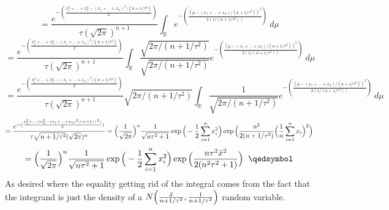 \documentclass{article}
\begin{document}
\begin{center}
    \[=\frac{e^{-(\frac{x_1^2 + ... + x_n^2 - (x_1 + ... + x_n)^2/(n + 1/\tau^2)}{2})}}{\tau(\sqrt{2\pi})^{n+1}}\int_{\mathbb{R}} e^{-(\frac{(\mu - (x_1 + ... + x_n)/(n + 1/\tau^2))^2}{2(1/(n + 1/\tau^2))})} \:d\mu\]
    \[=\frac{e^{-(\frac{x_1^2 + ... + x_n^2 - (x_1 + ... + x_n)^2/(n + 1/\tau^2)}{2})}}{\tau(\sqrt{2\pi})^{n+1}}\int_{\mathbb{R}} \frac{\sqrt{2\pi/(n+1/\tau^2)}}{\sqrt{2\pi/(n+1/\tau^2)}}e^{-(\frac{(\mu - (x_1 + ... + x_n)/(n + 1/\tau^2))^2}{2(1/(n + 1/\tau^2))})} \:d\mu\]
    \[=\frac{e^{-(\frac{x_1^2 + ... + x_n^2 - (x_1 + ... + x_n)^2/(n + 1/\tau^2)}{2})}}{\tau(\sqrt{2\pi})^{n+1}}\sqrt{2\pi/(n+1/\tau^2)}\int_{\mathbb{R}} \frac{1}{\sqrt{2\pi/(n+1/\tau^2)}}e^{-(\frac{(\mu - (x_1 + ... + x_n)/(n + 1/\tau^2))^2}{2(1/(n + 1/\tau^2))})} \:d\mu\]
    \[=\frac{e^{-(\frac{x_1^2 + ... + x_n^2 - (x_1 + ... + x_n)^2/(n + 1/\tau^2)}{2})}}{\tau\sqrt{n+1/\tau^2}(\sqrt{2\pi})^n} =\Big{(}\frac{1}{\sqrt{2\pi}}\Big{)}^n\frac{1}{\sqrt{n\tau^2 + 1}}\exp{\Big{(}-\frac{1}{2}\sum_{i=1}^n x_i^2\Big{)}}\exp{\Big{(}\frac{n^2}{2(n + 1/\tau^2)}\Big{(}\frac{1}{n}\sum_{i=1}^n x_i\Big{)}^2\Big{)}}\]
    \[=\Big{(}\frac{1}{\sqrt{2\pi}}\Big{)}^n\frac{1}{\sqrt{n\tau^2 + 1}}\exp{\Big{(}-\frac{1}{2}\sum_{i=1}^n x_i^2\Big{)}}\exp{\Big{(}\frac{n\tau^2\Bar{x}^2}{2(n^2\tau^2 + 1)}\Big{)}}\;\;\qedsymbol\]
    As desired where the equality getting rid of the integral comes from the fact that the integrand is just the density of a $N\Big{(}\frac{\Bar{x}}{n+1/\tau^2},\frac{1}{n+1/\tau^2}\Big{)}$ random variable.
\end{center}
\end{document}
